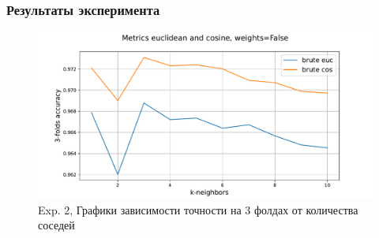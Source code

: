 \documentclass[10pt]{article}
\begin{document}
\begin{itemize}
		    \subsubsection*{Результаты эксперимента}
		    {
		    	\begin{figure}[h]
		    		\begin{minipage}[h]{0.51\linewidth}
		    		\end{minipage}
		    		\hfill
		    		\begin{minipage}[h]{0.51\linewidth}
		    		\end{minipage}
	    		    \vfill
	    		    \begin{minipage}[h]{0.51\linewidth}
	    			    \begin{center}
	    			    	\includegraphics[width=1.0\linewidth]{experiment2_chart3.pdf}
	    			    \end{center}
	    		    \end{minipage}
		    		\caption{Exp. 2, Графики зависимости точности на 3 фолдах от количества соседей}
		    		\label{ris:image2}
		    	\end{figure}
		    }
		    

\end{itemize}
\end{document}
